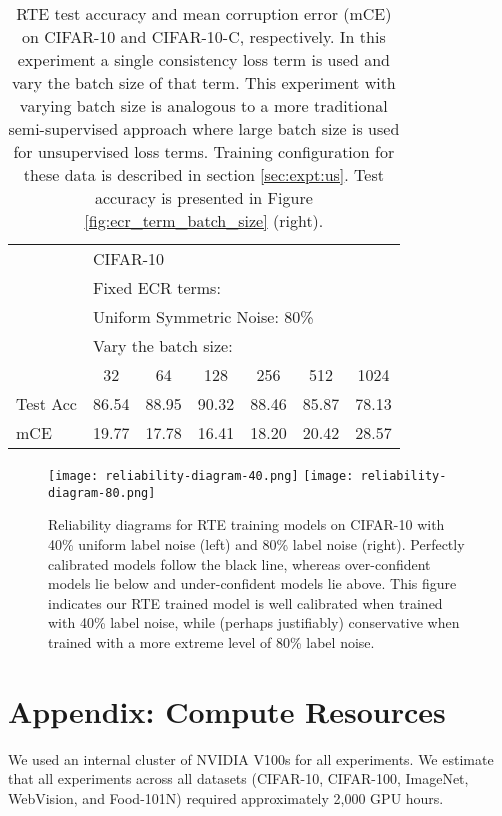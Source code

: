 \documentclass{article}
\begin{document}
\begin{table*}
    \renewcommand{\arraystretch}{1.3}
    \centering
    \caption{RTE test accuracy and mean corruption error (mCE) on CIFAR-10 and CIFAR-10-C, respectively.  In this experiment a single consistency loss term is used and vary the batch size of that term. This experiment with varying batch size is analogous to a more traditional semi-supervised approach where large batch size is used for unsupervised loss terms.  Training configuration for these data is described in section \ref{sec:expt:us}.  Test accuracy is presented in Figure \ref{fig:ecr_term_batch_size} (right).}\begin{tabular}{lcccccc}
        \\
        \toprule
        &\multicolumn{6}{l}{CIFAR-10} \\
        &\multicolumn{6}{l}{Fixed ECR terms: } \\
        &\multicolumn{6}{l}{Uniform Symmetric Noise: 80\%} \\
        \hline
        &\multicolumn{6}{l}{Vary the batch size:} \\
         & 32 & 64 & 128 & 256 & 512 & 1024  \\
         \hline
          Test Acc & 86.54 & 88.95 & 90.32 & 88.46 & 85.87 & 78.13 \\
          mCE & 19.77 & 17.78 & 16.41 & 18.20 & 20.42 & 28.57 \\
         \bottomrule
    \end{tabular}
    \label{tab:fig1_right}
\end{table*}

\begin{figure*}
  \centering
  \texttt{[image: reliability-diagram-40.png]}
  \texttt{[image: reliability-diagram-80.png]}
  \caption{Reliability diagrams for RTE training models on CIFAR-10 with 40\% uniform label noise (left) and 80\% label noise (right). Perfectly calibrated models follow the black line, whereas over-confident models lie below and under-confident models lie above. This figure indicates our RTE trained model is well calibrated when trained with 40\% label noise, while (perhaps justifiably) conservative when trained with a more extreme level of 80\% label noise.}
  \label{fig:reliability-diagrams}
\end{figure*}



\section{Appendix: Compute Resources}

We used an internal cluster of NVIDIA V100s for all experiments. We estimate that all experiments across all datasets (CIFAR-10, CIFAR-100, ImageNet, WebVision, and Food-101N) required approximately 2,000 GPU hours.
\end{document}
